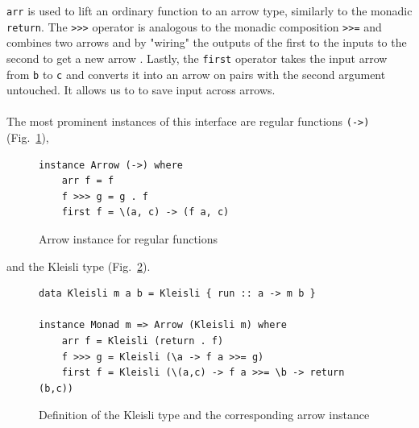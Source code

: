 \lstinline{arr} is used to lift an ordinary function to an arrow type, similarly to the monadic \lstinline{return}. The \lstinline{>>>} operator is analogous to the monadic composition  \lstinline{>>=} and combines two arrows  and  by "wiring" the outputs of the first to the inputs to the second to get a new arrow . Lastly, the \lstinline{first} operator  takes the input arrow from \lstinline{b} to \lstinline{c} and converts it into an arrow on pairs with the second argument untouched. It allows us to to save input across arrows.
\\\\
The most prominent instances of this interface are regular functions \lstinline{(->)} (Fig.~\ref{fig:arrowfn}),
\begin{figure}[h]
\begin{lstlisting}[frame=htrbl]
instance Arrow (->) where
	arr f = f
	f >>> g = g . f
	first f = \(a, c) -> (f a, c) 
\end{lstlisting}
\caption{Arrow instance for regular functions}
\label{fig:arrowfn}
\end{figure}
and the Kleisli type (Fig.~\ref{fig:arrowkleisli}).
\begin{figure}[h]
\begin{lstlisting}[frame=htrbl]
data Kleisli m a b = Kleisli { run :: a -> m b }

instance Monad m => Arrow (Kleisli m) where
	arr f = Kleisli (return . f)
	f >>> g = Kleisli (\a -> f a >>= g)
	first f = Kleisli (\(a,c) -> f a >>= \b -> return (b,c))
\end{lstlisting}%
\caption{Definition of the Kleisli type and the corresponding arrow instance}
\label{fig:arrowkleisli}
\end{figure}
